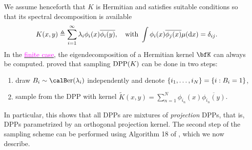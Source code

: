 \documentclass[twoside,11pt]{article}
\begin{document}
      We assume henceforth that $K$ is Hermitian and satisfies suitable conditions \cite[Theorem 3]{Sos00} so that its spectral decomposition is available
      \begin{equation*}
      \label{eq:eigdec_kernel}
        K(x,y)
        \triangleq
          \sum\limits_{i=1}^{\infty}
            \lambda_i \phi_i(x) \overline{\phi_i(y)},
          \quad \text{with }
            \int \phi_i(x) \overline{\phi_j(x)} \mu(\mathop{}\!\mathrm{d} x) = \delta_{ij}.
      \end{equation*}
      In the \href{https://dppy.readthedocs.io/en/latest/finite_dpps/exact_sampling.html}{\textcolor{magenta}{finite case}}, the eigendecomposition of a Hermitian kernel $\bfK$ can always be computed.
      \citet[Theorem 7]{HKPV06} proved that sampling $\operatorname{DPP}(K)$ can be done in two steps:
      \begin{enumerate}
        \item draw $B_i\sim\Ber(\lambda_i)$ independently and denote $\left\{ i_1,\dots,i_{N} \right\} = \left\{ i:B_i=1 \right\}$,
        \item sample from the DPP with kernel $\tilde{K}(x,y) = \sum_{n=1}^{N}\phi_{i_n}(x) \overline{\phi_{i_n}(y)}$.
      \end{enumerate}
      In particular, this shows that all DPPs are mixtures of \emph{projection} DPPs, that is, DPPs parametrized by an orthogonal projection kernel.
      The second step of the sampling scheme can be performed using Algorithm 18 of \cite{HKPV06}, which we now describe.
\end{document}
